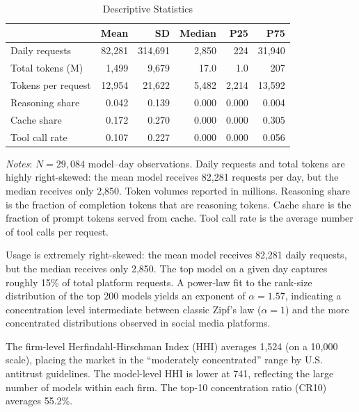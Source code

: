 \documentclass[11pt, a4paper]{article}
\begin{document}
\begin{table}[H]
\centering
\caption{Descriptive Statistics}
\label{tab:descstats}
\begin{threeparttable}
\begin{tabular}{lrrrrr}
\toprule
& Mean & SD & Median & P25 & P75 \\
\midrule
Daily requests & 82,281 & 314,691 & 2,850 & 224 & 31,940 \\
Total tokens (M) & 1,499 & 9,679 & 17.0 & 1.0 & 207 \\
Tokens per request & 12,954 & 21,622 & 5,482 & 2,214 & 13,592 \\
Reasoning share & 0.042 & 0.139 & 0.000 & 0.000 & 0.004 \\
Cache share & 0.172 & 0.270 & 0.000 & 0.000 & 0.305 \\
Tool call rate & 0.107 & 0.227 & 0.000 & 0.000 & 0.056 \\
\bottomrule
\end{tabular}
\begin{tablenotes}[flushleft]
\small
\item \textit{Notes}: $N = 29{,}084$ model--day observations. Daily requests and total tokens are highly right-skewed: the mean model receives 82,281 requests per day, but the median receives only 2,850. Token volumes reported in millions. Reasoning share is the fraction of completion tokens that are reasoning tokens. Cache share is the fraction of prompt tokens served from cache. Tool call rate is the average number of tool calls per request.
\end{tablenotes}
\end{threeparttable}
\end{table}

Usage is extremely right-skewed: the mean model receives 82,281 daily requests, but the median receives only 2,850. The top model on a given day captures roughly 15\% of total platform requests. A power-law fit to the rank-size distribution of the top 200 models yields an exponent of $\alpha = 1.57$, indicating a concentration level intermediate between classic Zipf's law ($\alpha = 1$) and the more concentrated distributions observed in social media platforms.

The firm-level Herfindahl-Hirschman Index (HHI) averages 1,524 (on a 10,000 scale), placing the market in the ``moderately concentrated'' range by U.S. antitrust guidelines. The model-level HHI is lower at 741, reflecting the large number of models within each firm. The top-10 concentration ratio (CR10) averages 55.2\%.
\end{document}
